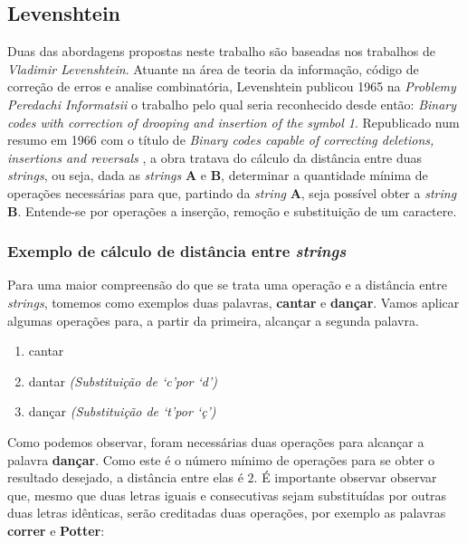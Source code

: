 \subsection{Levenshtein} %
\label{sec:leveinstein}

Duas das abordagens propostas neste trabalho são baseadas nos trabalhos de \textit{Vladimir Levenshtein}. Atuante na área de teoria da informação, código de correção de erros e analise combinatória, Levenshtein publicou 1965 na \textit{Problemy Peredachi Informatsii} o trabalho pelo qual seria reconhecido desde então: \textit{Binary codes with correction of drooping and insertion of the symbol 1}\cite{levenshtein1965}. Republicado num resumo em 1966 com o título de \textit{Binary codes capable of correcting deletions, insertions and reversals} \cite{levenshtein1966}, a obra tratava do cálculo da distância entre duas \textit{strings}, ou seja, dada as \textit{strings} \textbf{A} e \textbf{B}, determinar a quantidade mínima de operações necessárias para que, partindo da \textit{string} \textbf{A}, seja possível obter a \textit{string} \textbf{B}. Entende-se por operações a inserção, remoção e substituição de um caractere.

\subsubsection{Exemplo de cálculo de distância entre \textit{strings}} %
\label{sub:exemplo_de_c_lculo_de_distancia_entre_it}

Para uma maior compreensão do que se trata uma operação e a distância entre \textit{strings}, tomemos como exemplos duas palavras, \textbf{cantar} e \textbf{dançar}. Vamos aplicar algumas operações para, a partir da primeira, alcançar a segunda palavra.


\begin{enumerate}[start=0]
	\item cantar
	\item dantar \textit{(Substituição de \lq c\rq por \lq d\rq)}
	\item dançar \textit{(Substituição de \lq t\rq por \lq ç\rq)}
\end{enumerate}

Como podemos observar, foram necessárias duas operações para alcançar a palavra \textbf{dançar}. Como este é o número mínimo de operações para se obter o resultado desejado, a distância entre elas é $2$.
É importante observar observar que, mesmo que duas letras iguais e consecutivas sejam substituídas por outras duas letras idênticas, serão creditadas duas operações, por exemplo as palavras \textbf{correr} e \textbf{Potter}:

